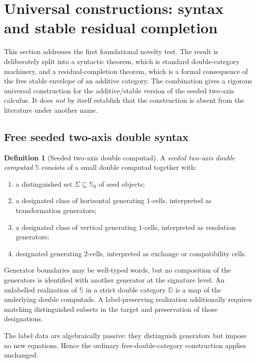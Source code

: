 \documentclass[11pt]{article}
\theoremstyle{definition}
\newtheorem{definition}[theorem]{Definition}
\theoremstyle{remark}
\newcommand{\Seeds}{\Sigma}
\begin{document}
\section{Universal constructions: syntax and stable residual completion}\label{sec:universal}

This section addresses the first foundational novelty test. The result is deliberately split into a syntactic theorem, which is standard double-category machinery, and a residual-completion theorem, which is a formal consequence of the free stable envelope of an additive category. The combination gives a rigorous universal construction for the additive/stable version of the seeded two-axis calculus. It does \emph{not} by itself establish that the construction is absent from the literature under another name.

\subsection{Free seeded two-axis double syntax}

\begin{definition}[Seeded two-axis double computad]\label{def:twoaxis-computad}
A \emph{seeded two-axis double computad} $\mathbb S$ consists of a small double computad together with:
\begin{enumerate}
    \item a distinguished set $\Seeds\subseteq \mathbb S_0$ of seed objects;
    \item a designated class of horizontal generating $1$-cells, interpreted as transformation generators;
    \item a designated class of vertical generating $1$-cells, interpreted as resolution generators;
    \item designated generating $2$-cells, interpreted as exchange or compatibility cells.
\end{enumerate}
Generator boundaries may be well-typed words, but no composition of the generators is identified with another generator at the signature level. An unlabelled realization of $\mathbb S$ in a strict double category $\mathbb D$ is a map of the underlying double computads. A label-preserving realization additionally requires matching distinguished subsets in the target and preservation of those designations.
\end{definition}

The label data are algebraically passive: they distinguish generators but impose no new equations. Hence the ordinary free-double-category construction applies unchanged.
\end{document}
